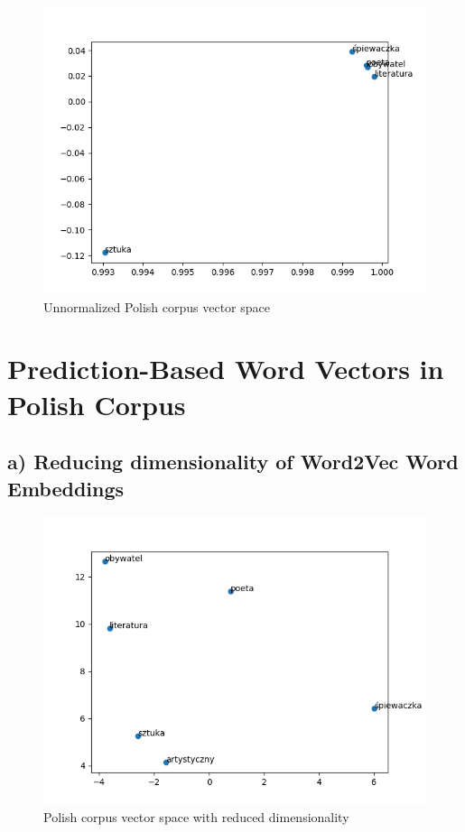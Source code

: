 \documentclass[12pt]{article}
\begin{document}
\begin{figure}[!h]
\centering
\includegraphics[width=0.95\columnwidth]{plot_1e_2.png}
\caption{Unnormalized Polish corpus vector space}
\label{fig:image}
\end{figure}

 
\section{Prediction-Based Word Vectors in Polish Corpus}
\subsection*{a) Reducing dimensionality of Word2Vec Word Embeddings}

\begin{figure}[!h]
\centering
\includegraphics[width=0.95\columnwidth]{plot_2a.png}
\caption{Polish corpus vector space with reduced dimensionality}
\label{fig:image}
\end{figure}
\end{document}
